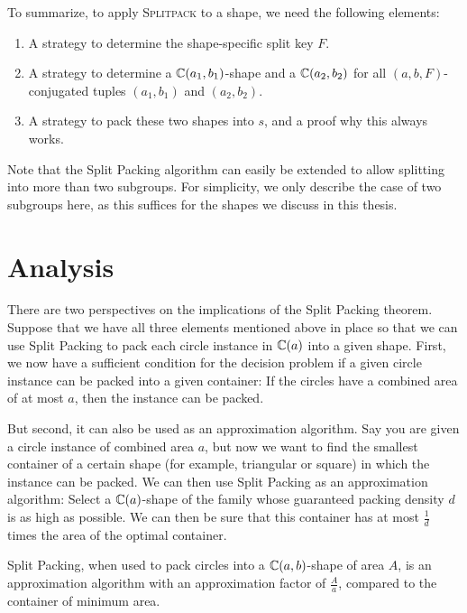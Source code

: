 \documentclass[a4paper,style=print,bibliography=totoc,nexus,lnum,extramargin]{tubsbook}
\begin{document}
To summarize, to apply \textsc{Splitpack} to a shape, we need the following elements:

\begin{enumerate}
    \item A strategy to determine the shape-specific split key $F$.
    \item A strategy to determine a $\mathbb{C}(a_1, b_1)$-shape and a $\mathbb{C}(a_2, b_2)$ for all $(a,b,F)$-conjugated tuples $(a_1, b_1)$ and $(a_2, b_2)$.
    \item A strategy to pack these two shapes into $s$, and a proof why this always works.
\end{enumerate}

Note that the Split Packing algorithm can easily be extended to allow splitting into more than two subgroups. For simplicity, we only describe the case of two subgroups here, as this suffices for the shapes we discuss in this thesis.

\section{Analysis}

There are two perspectives on the implications of the Split Packing theorem. Suppose that we have all three elements mentioned above in place so that we can use Split Packing to pack each circle instance in $\mathbb{C}(a)$ into a given shape.
First, we now have a sufficient condition for the decision problem if a given circle instance can be packed into a given container: If the circles have a combined area of at most $a$, then the instance can be packed.

But second, it can also be used as an approximation algorithm. Say you are given a circle instance of combined area $a$, but now we want to find the smallest container of a certain shape (for example, triangular or square) in which the instance can be packed. We can then use Split Packing as an approximation algorithm: Select a $\mathbb{C}(a)$-shape of the family whose guaranteed packing density $d$ is as high as possible. We can then be sure that this container has at most $\frac{1}{d}$ times the area of the optimal container.

\begin{theorem}
    Split Packing, when used to pack circles into a $\mathbb{C}(a,b)$-shape of area $A$, is an approximation algorithm with an approximation factor of $\frac{A}{a}$, compared to the container of minimum area.
\end{theorem}
\end{document}
